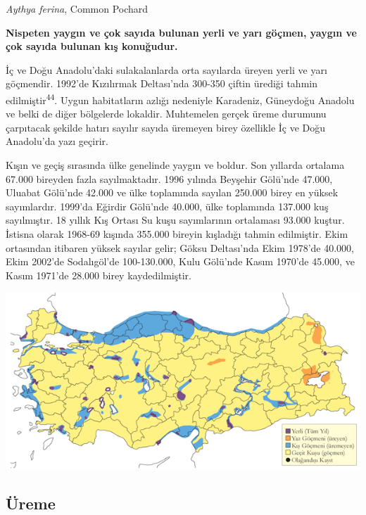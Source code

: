 \documentclass[
  letterpaper,
  DIV=11,
  numbers=noendperiod]{scrreprt}
\begin{document}
\emph{Aythya ferina}, Common Pochard

\textbf{Nispeten yaygın ve çok sayıda bulunan yerli ve yarı göçmen,
yaygın ve çok sayıda bulunan kış konuğudur.}

İç ve Doğu Anadolu'daki sulakalanlarda orta sayılarda üreyen yerli ve
yarı göçmendir. 1992'de Kızılırmak Deltası'nda 300-350 çiftin ürediği
tahmin edilmiştir\textsuperscript{44}. Uygun habitatların azlığı
nedeniyle Karadeniz, Güneydoğu Anadolu ve belki de diğer bölgelerde
lokaldir. Muhtemelen gerçek üreme durumunu çarpıtacak şekilde hatırı
sayılır sayıda üremeyen birey özellikle İç ve Doğu Anadolu'da yazı
geçirir.

Kışın ve geçiş sırasında ülke genelinde yaygın ve boldur. Son yıllarda
ortalama 67.000 bireyden fazla sayılmaktadır. 1996 yılında Beyşehir
Gölü'nde 47.000, Uluabat Gölü'nde 42.000 ve ülke toplamında sayılan
250.000 birey en yüksek sayımlardır. 1999'da Eğirdir Gölü'nde 40.000,
ülke toplamında 137.000 kuş sayılmıştır. 18 yıllık Kış Ortası Su kuşu
sayımlarının ortalaması 93.000 kuştur. İstisna olarak 1968-69 kışında
355.000 bireyin kışladığı tahmin edilmiştir. Ekim ortasından itibaren
yüksek sayılar gelir; Göksu Deltası'nda Ekim 1978'de 40.000, Ekim
2002'de Sodalıgöl'de 100-130.000, Kulu Gölü'nde Kasım 1970'de 45.000, ve
Kasım 1971'de 28.000 birey kaydedilmiştir.

\includegraphics{images/harita_Page_023.png}

\hypertarget{uxfcreme-22}{%
\subsection{\texorpdfstring{\textbf{Üreme}}{Üreme}}\label{uxfcreme-22}}
\end{document}
